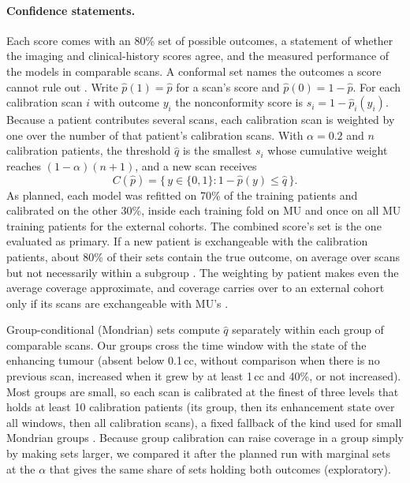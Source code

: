 \paragraph*{Confidence statements.} Each score comes with an 80\% set of possible outcomes, a statement of whether the
imaging and clinical-history scores agree, and the measured performance of the models in comparable scans. A conformal
set names the outcomes a score cannot rule out \citep{angelopoulos2023}. Write $\hat p(1) = \hat p$ for a scan's score
and $\hat p(0) = 1 - \hat p$. For each calibration scan $i$ with outcome $y_i$ the nonconformity score is
$s_i = 1 - \hat p_i(y_i)$. Because a patient contributes several scans, each calibration scan is weighted by one over
the number of that patient's calibration scans. With $\alpha = 0.2$ and $n$ calibration patients, the threshold $\hat
q$ is the smallest $s_i$ whose cumulative weight reaches $(1 - \alpha)(n + 1)$, and a new scan receives
\begin{equation}
C(\hat p) = \{\, y \in \{0, 1\} : 1 - \hat p(y) \le \hat q \,\}.
\end{equation}
As planned, each model was refitted on 70\% of the training patients and calibrated on the other 30\%, inside each
training fold on MU and once on all MU training patients for the external cohorts. The combined score's set is the
one evaluated as primary. If a new patient is exchangeable with the calibration patients, about 80\% of their sets
contain the true outcome, on average over scans but not necessarily within a subgroup
\citep{romano2020,barber2021limits}. The weighting by patient makes even the average coverage approximate, and
coverage carries over to an external cohort only if its scans are exchangeable with MU's \citep{mehrtens2023}.

Group-conditional (Mondrian) sets \citep{vovk2022book} compute $\hat q$ separately within each group of comparable
scans. Our groups cross the time window with the state of the enhancing tumour (absent below 0.1\,cc, without
comparison when there is no previous scan, increased when it grew by at least 1\,cc and 40\%, or not increased). Most
groups are small, so each scan is calibrated at the finest of three levels that holds at least 10 calibration
patients (its group, then its enhancement state over all windows, then all calibration scans), a fixed fallback of the
kind used for small Mondrian groups \citep{johansson2015,ding2023}. Because group calibration can raise coverage in a
group simply by making sets larger, we compared it after the planned run with marginal sets at the $\alpha$ that gives
the same share of sets holding both outcomes (exploratory).

